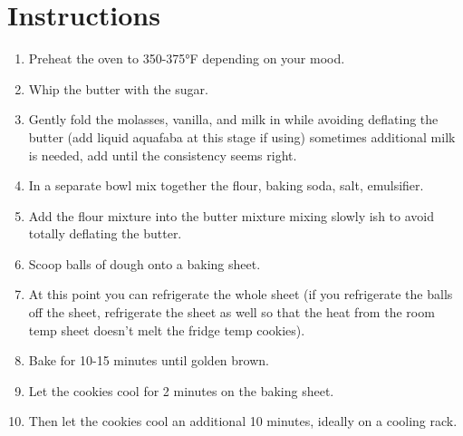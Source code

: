 \documentclass[twocolumn]{article}
\begin{document}
\section*{\color{sectioncolor}Instructions}
\begin{enumerate}
    \item Preheat the oven to 350-375°F depending on your mood.
    \item Whip the butter with the sugar.
    \item Gently fold the molasses, vanilla, and milk in while avoiding deflating the butter (add liquid aquafaba at this stage if using) sometimes additional milk is needed, add until the consistency seems right.
    \item In a separate bowl mix together the flour, baking soda, salt, emulsifier.
    \item Add the flour mixture into the butter mixture mixing slowly ish to avoid totally deflating the butter.
    \item Scoop balls of dough onto a baking sheet.
    \item At this point you can refrigerate the whole sheet (if you refrigerate the balls off the sheet, refrigerate the sheet as well so that the heat from the room temp sheet doesn't melt the fridge temp cookies).
    \item Bake for 10-15 minutes until golden brown.
    \item Let the cookies cool for 2 minutes on the baking sheet.
    \item Then let the cookies cool an additional 10 minutes, ideally on a cooling rack.
\end{enumerate}
\end{document}
